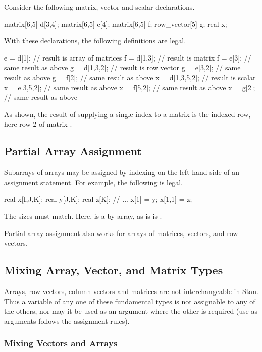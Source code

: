Consider the following matrix, vector and scalar declarations.
%
\begin{stancode}
matrix[6,5] d[3,4];
matrix[6,5] e[4];
matrix[6,5] f;
row_vector[5] g;
real x;
\end{stancode}
%
With these declarations, the following definitions are legal.
%
\begin{stancode}
e = d[1];        // result is array of matrices
f = d[1,3];      // result is matrix
f = e[3];        //   same result as above
g = d[1,3,2];    // result is row vector
g = e[3,2];      //   same result as above
g = f[2];        //   same result as above
x = d[1,3,5,2];  // result is scalar
x = e[3,5,2];    //   same result as above
x = f[5,2];      //   same result as above
x = g[2];        //   same result as above
\end{stancode}
%
As shown, the result  of supplying a single index to a
matrix is the indexed row, here row 2 of matrix .


\subsection{Partial Array Assignment}

Subarrays of arrays may be assigned by indexing on the left-hand side
of an assignment statement.  For example, the following is legal.
%
\begin{stancode}
real x[I,J,K];
real y[J,K];
real z[K];
// ...
x[1] = y;
x[1,1] = z;
\end{stancode}
%
The sizes must match.  Here,  is a  by 
array, as is is .

Partial array assignment also works for arrays of matrices, vectors,
and row vectors.


\subsection{Mixing Array, Vector, and Matrix Types}

Arrays, row vectors, column vectors and matrices are not
interchangeable in Stan.  Thus a variable of any one of these
fundamental types is not assignable to any of the others, nor may it
be used as an argument where the other is required (use as arguments
follows the assignment rules).



\subsubsection{Mixing Vectors and Arrays}

